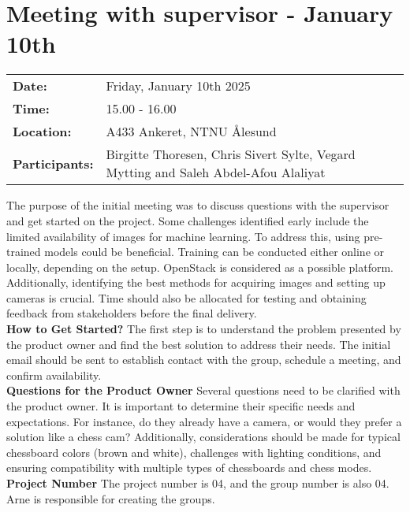 \section{Meeting with supervisor - January 10th}
\begin{tabular}{ll}
    \textbf{Date:} & Friday, January 10th 2025 \\
    \textbf{Time:} & 15.00 - 16.00\\
    \textbf{Location:} & A433 Ankeret, NTNU Ålesund \\
    \textbf{Participants:} & Birgitte Thoresen, Chris Sivert Sylte, Vegard Mytting and Saleh Abdel-Afou Alaliyat\\
\end{tabular}

\vspace{0.5cm}

The purpose of the initial meeting was to discuss questions with the supervisor and get started on the project. Some challenges identified early include the limited availability of images for machine learning. To address this, using pre-trained models could be beneficial. Training can be conducted either online or locally, depending on the setup. OpenStack is considered as a possible platform. Additionally, identifying the best methods for acquiring images and setting up cameras is crucial. Time should also be allocated for testing and obtaining feedback from stakeholders before the final delivery. \\

\textbf{How to Get Started?}  
The first step is to understand the problem presented by the product owner and find the best solution to address their needs. The initial email should be sent to establish contact with the group, schedule a meeting, and confirm availability. \\

\textbf{Questions for the Product Owner}  
Several questions need to be clarified with the product owner. It is important to determine their specific needs and expectations. For instance, do they already have a camera, or would they prefer a solution like a chess cam? Additionally, considerations should be made for typical chessboard colors (brown and white), challenges with lighting conditions, and ensuring compatibility with multiple types of chessboards and chess modes. \\

\textbf{Project Number}  
The project number is 04, and the group number is also 04. Arne is responsible for creating the groups. \\

